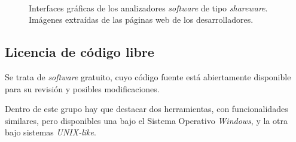 \begin{figure}[htbp]
    \centering
     \\
    \caption{Interfaces gráficas de los analizadores \emph{software} de tipo \emph{shareware}. Imágenes extraídas de las páginas web de los desarrolladores.} 
    \label{fig:matriz-gui-close-sw}
\end{figure}


\subsection{Licencia de código libre\cite{gonzalez2003introduccion}}
Se trata de \emph{software} gratuito, cuyo código fuente está abiertamente disponible para su revisión y posibles modificaciones.

Dentro de este grupo hay que destacar dos herramientas, con funcionalidades similares, pero disponibles una bajo el Sistema Operativo \emph{Windows\texttrademark}, y la otra bajo sistemas \emph{UNIX-like}.

